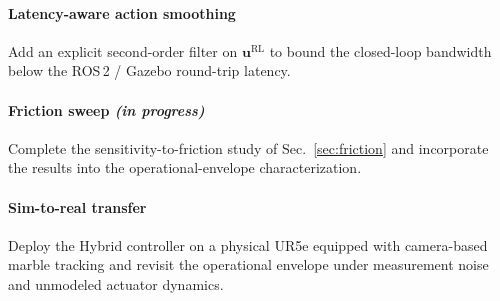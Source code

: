 \documentclass[conference]{IEEEtran}
\begin{document}
\paragraph*{Latency-aware action smoothing} Add an explicit second-order
filter on $\bm{u}^{\text{RL}}$ to bound the closed-loop bandwidth below the
ROS\,2 / Gazebo round-trip latency.
\paragraph*{Friction sweep \emph{(in progress)}} Complete the
sensitivity-to-friction study of Sec.~\ref{sec:friction} and incorporate the
results into the operational-envelope characterization.
\paragraph*{Sim-to-real transfer} Deploy the Hybrid controller on a physical
UR5e equipped with camera-based marble tracking and revisit the operational
envelope under measurement noise and unmodeled actuator dynamics.




\end{document}
